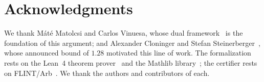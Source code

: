 \documentclass[11pt, letterpaper]{article}
\theoremstyle{paperplain}
\theoremstyle{paperdef}
\begin{document}
\section*{Acknowledgments}

We thank M\'at\'e Matolcsi and Carlos Vinuesa, whose dual
framework~\cite{MV10} is the foundation of this argument; and
Alexander Cloninger and Stefan Steinerberger~\cite{CS17}, whose
announced bound of $1.28$ motivated this line of work.  The
formalization rests on the Lean~4 theorem prover~\cite{Lean} and the
Mathlib library~\cite{Mathlib}; the certifier rests on
FLINT/Arb~\cite{Flint}.  We thank the authors and contributors of
each.


\end{document}
